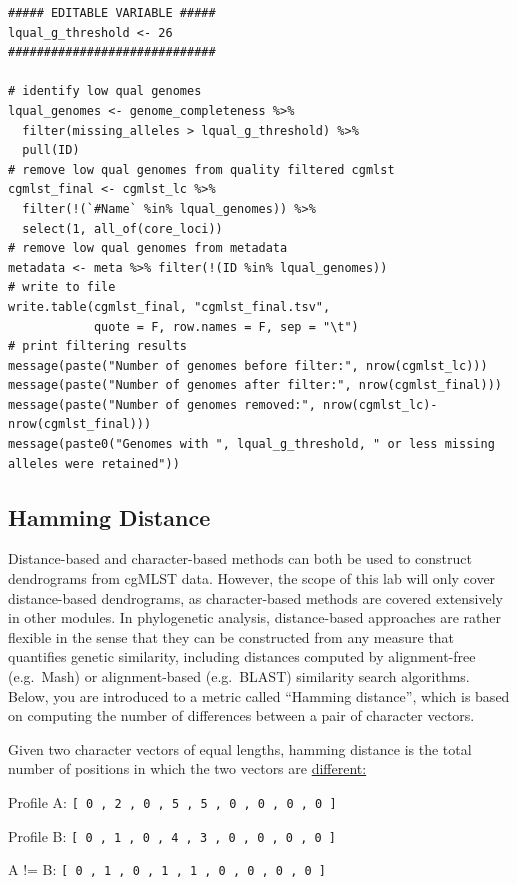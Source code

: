 \documentclass[
]{book}
\begin{document}
\begin{verbatim}
##### EDITABLE VARIABLE #####
lqual_g_threshold <- 26
#############################

# identify low qual genomes
lqual_genomes <- genome_completeness %>% 
  filter(missing_alleles > lqual_g_threshold) %>% 
  pull(ID)
# remove low qual genomes from quality filtered cgmlst
cgmlst_final <- cgmlst_lc %>% 
  filter(!(`#Name` %in% lqual_genomes)) %>% 
  select(1, all_of(core_loci))
# remove low qual genomes from metadata
metadata <- meta %>% filter(!(ID %in% lqual_genomes))
# write to file
write.table(cgmlst_final, "cgmlst_final.tsv",
            quote = F, row.names = F, sep = "\t")
# print filtering results
message(paste("Number of genomes before filter:", nrow(cgmlst_lc)))
message(paste("Number of genomes after filter:", nrow(cgmlst_final)))
message(paste("Number of genomes removed:", nrow(cgmlst_lc)-nrow(cgmlst_final)))
message(paste0("Genomes with ", lqual_g_threshold, " or less missing alleles were retained"))
\end{verbatim}

\subsection{Hamming Distance}\label{hamming-distance}

Distance-based and character-based methods can both be used to construct dendrograms from cgMLST data. However, the scope of this lab will only cover distance-based dendrograms, as character-based methods are covered extensively in other modules. In phylogenetic analysis, distance-based approaches are rather flexible in the sense that they can be constructed from any measure that quantifies genetic similarity, including distances computed by alignment-free (e.g.~Mash) or alignment-based (e.g.~BLAST) similarity search algorithms. Below, you are introduced to a metric called ``Hamming distance'', which is based on computing the number of differences between a pair of character vectors.

Given two character vectors of equal lengths, hamming distance is the total number of positions in which the two vectors are \ul{different:}

Profile A: \texttt{{[}\ 0\ ,\ 2\ ,\ 0\ ,\ 5\ ,\ 5\ ,\ 0\ ,\ 0\ ,\ 0\ ,\ 0\ {]}}

Profile B: \texttt{{[}\ 0\ ,\ 1\ ,\ 0\ ,\ 4\ ,\ 3\ ,\ 0\ ,\ 0\ ,\ 0\ ,\ 0\ {]}}

A != B: \texttt{{[}\ 0\ ,\ 1\ ,\ 0\ ,\ 1\ ,\ 1\ ,\ 0\ ,\ 0\ ,\ 0\ ,\ 0\ {]}}
\end{document}
